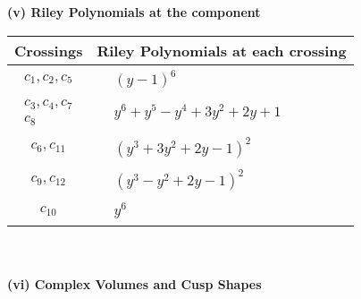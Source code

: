 \documentclass[1p]{elsarticle_modified}
\theoremstyle{definition}
\begin{document}
\newpage\renewcommand{\arraystretch}{1}
\flushleft \textbf{(v) Riley Polynomials at the component}\newline \\
\begin{tabular}{m{50pt}|m{274pt}}
Crossings & \hspace{64pt}Riley Polynomials at each crossing \\
\hline $$\begin{aligned}c_{1},c_{2},c_{5}\end{aligned}$$&$\begin{aligned}
&(y-1)^6
\end{aligned}$\\
\hline $$\begin{aligned}c_{3},c_{4},c_{7}\\c_{8}\end{aligned}$$&$\begin{aligned}
&y^6+y^5- y^4+3 y^2+2 y+1
\end{aligned}$\\
\hline $$\begin{aligned}c_{6},c_{11}\end{aligned}$$&$\begin{aligned}
&(y^3+3 y^2+2 y-1)^2
\end{aligned}$\\
\hline $$\begin{aligned}c_{9},c_{12}\end{aligned}$$&$\begin{aligned}
&(y^3- y^2+2 y-1)^2
\end{aligned}$\\
\hline $$\begin{aligned}c_{10}\end{aligned}$$&$\begin{aligned}
&y^6
\end{aligned}$\\
\hline
\end{tabular}\\~\\
\newpage\flushleft \textbf{(vi) Complex Volumes and Cusp Shapes}
\end{document}
